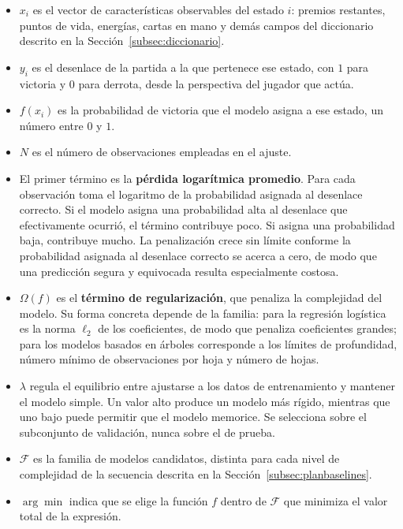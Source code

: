 \begin{itemize}
  \item $x_i$ es el vector de características observables del estado $i$:
        premios restantes, puntos de vida, energías, cartas en mano y demás
        campos del diccionario descrito en la
        Sección~\ref{subsec:diccionario}.
  \item $y_i$ es el desenlace de la partida a la que pertenece ese estado,
        con $1$ para victoria y $0$ para derrota, desde la perspectiva del
        jugador que actúa.
  \item $f(x_i)$ es la probabilidad de victoria que el modelo asigna a ese
        estado, un número entre $0$ y $1$.
  \item $N$ es el número de observaciones empleadas en el ajuste.
  \item El primer término es la \textbf{pérdida logarítmica promedio}. Para
        cada observación toma el logaritmo de la probabilidad asignada al
        desenlace correcto. Si el modelo asigna una probabilidad alta al
        desenlace que efectivamente ocurrió, el término contribuye poco. Si
        asigna una probabilidad baja, contribuye mucho. La penalización
        crece sin límite conforme la probabilidad asignada al desenlace
        correcto se acerca a cero, de modo que una predicción segura y
        equivocada resulta especialmente costosa.
  \item $\Omega(f)$ es el \textbf{término de regularización}, que penaliza la
        complejidad del modelo. Su forma concreta depende de la familia:
        para la regresión logística es la norma $\ell_2$ de los coeficientes,
        de modo que penaliza coeficientes grandes; para los modelos basados
        en árboles corresponde a los límites de profundidad, número mínimo de
        observaciones por hoja y número de hojas.
  \item $\lambda$ regula el equilibrio entre ajustarse a los datos de
        entrenamiento y mantener el modelo simple. Un valor alto produce un
        modelo más rígido, mientras que uno bajo puede permitir que el modelo memorice. Se selecciona
        sobre el subconjunto de validación, nunca sobre el de prueba.
  \item $\mathcal{F}$ es la familia de modelos candidatos, distinta para cada
        nivel de complejidad de la secuencia descrita en la
        Sección~\ref{subsec:planbaselines}.
  \item $\arg\min$ indica que se elige la función $f$ dentro de
        $\mathcal{F}$ que minimiza el valor total de la expresión.
\end{itemize}

